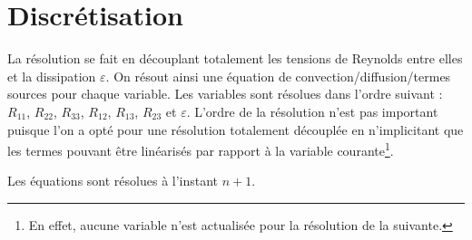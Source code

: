 %
%
%
%
%
%
%
%

\section{Discr\'etisation}
La r\'esolution se fait en d\'ecouplant totalement les tensions de Reynolds
entre elles et la dissipation $\varepsilon$. On r\'esout ainsi une \'equation de
convection/diffusion/termes sources pour chaque variable. Les variables sont
r\'esolues dans l'ordre suivant : $R_{11}$, $R_{22}$, $R_{33}$, $R_{12}$,
$R_{13}$, $R_{23}$ et $ \varepsilon$. L'ordre de la r\'esolution n'est pas
important puisque l'on a opt\'e pour une r\'esolution totalement d\'ecoupl\'ee
en n'implicitant que les termes pouvant \^etre lin\'earis\'es par rapport \`a la
variable courante\footnote{En effet, aucune variable n'est actualis\'ee pour la r\'esolution de la suivante.}.

Les \'equations sont r\'esolues \`a l'instant $n+1$.
